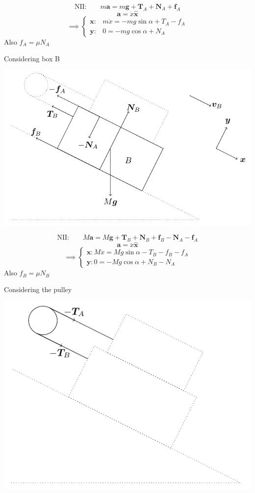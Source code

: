 \documentclass{article}
\newcommand{\vh}[1]{\vec{\hat{#1}}}
\renewcommand{\vec}[1]{\bm{#1}}
\newcommand{\vv}[1]{\vec{#1}}
\begin{document}
\[\text{NII:}\qquad m\vv a=m\vv g+\vv T_A+\vv N_A+\vv f_A\]
\[\vv a=\ddot x\vh x\]
\[\implies\left\{
\begin{array}{cc}
\vv x: & m\ddot x=-mg\sin\alpha+T_A-f_A\\
\vv y: & 0 = -mg\cos\alpha+N_A
\end{array}
\right.\]
Also \(f_A=\mu N_A\)

Considering box B

\begin{center}
\includegraphics[scale=0.4]{BoxB}
\end{center}

\[\text{NII:}\qquad M\vv a=M\vv g+\vv T_B+\vv N_B+\vv f_B-\vv N_A-\vv f_A\]
\[\vv a=\ddot x\vh x\]
\[\implies\left\{
\begin{array}{cc}
\vv x: M\ddot x=Mg\sin\alpha-T_B-f_B-f_A\\
\vv y: 0=-Mg\cos\alpha+N_B-N_A
\end{array}
\right.\]
Also \(f_B=\mu N_B\)

Considering the  pulley

\begin{center}
\includegraphics[scale=0.4]{Pulley}
\end{center}
\end{document}
